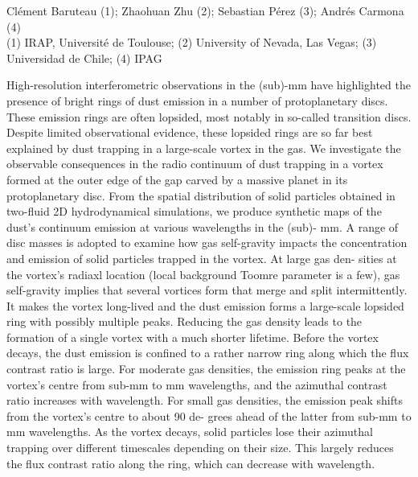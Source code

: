 \documentclass[a4paper,11pt]{book}
\begin{document}
\begin{center}
    
{\large Clément Baruteau (1)};{ \large  Zhaohuan Zhu (2)};{ \large  Sebastian Pérez (3)};{ \large  Andrés Carmona (4)}\\
  
\vspace{2 mm}
\noindent (1) IRAP, Université de Toulouse; (2)  University of Nevada, Las Vegas; (3)  Universidad de Chile; (4)  IPAG\\

\end{center}



  
\vspace{2 mm}
\noindent High-resolution interferometric observations in the (sub)-mm have highlighted the presence of bright rings of dust emission in a number of protoplanetary discs. These emission rings are often lopsided, most notably in so-called transition discs. Despite limited observational evidence, these lopsided rings are so far best explained by dust trapping in a large-scale vortex in the gas. We investigate the observable consequences in the radio continuum of dust trapping in a vortex formed at the outer edge of the gap carved by a massive planet in its protoplanetary disc. From the spatial distribution of solid particles obtained in two-fluid 2D hydrodynamical simulations, we produce synthetic maps of the dust’s continuum emission at various wavelengths in the (sub)- mm. A range of disc masses is adopted to examine how gas self-gravity impacts the concentration and emission of solid particles trapped in the vortex. At large gas den- sities at the vortex’s radiaxl location (local background Toomre parameter is a few), gas self-gravity implies that several vortices form that merge and split intermittently. It makes the vortex long-lived and the dust emission forms a large-scale lopsided ring with possibly multiple peaks. Reducing the gas density leads to the formation of a single vortex with a much shorter lifetime. Before the vortex decays, the dust emission is confined to a rather narrow ring along which the flux contrast ratio is large. For moderate gas densities, the emission ring peaks at the vortex’s centre from sub-mm to mm wavelengths, and the azimuthal contrast ratio increases with wavelength. For small gas densities, the emission peak shifts from the vortex’s centre to about 90 de- grees ahead of the latter from sub-mm to mm wavelengths. As the vortex decays, solid particles lose their azimuthal trapping over different timescales depending on their size. This largely reduces the flux contrast ratio along the ring, which can decrease with wavelength.
\end{document}
